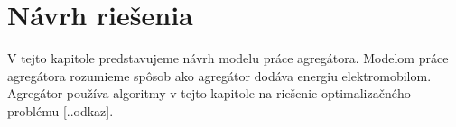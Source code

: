 

% 


\chapter{Návrh riešenia}
V tejto kapitole predstavujeme návrh modelu práce agregátora. Modelom práce agregátora rozumieme spôsob ako agregátor dodáva energiu elektromobilom. Agregátor používa algoritmy v tejto kapitole na riešenie optimalizačného problému [..odkaz]. 








